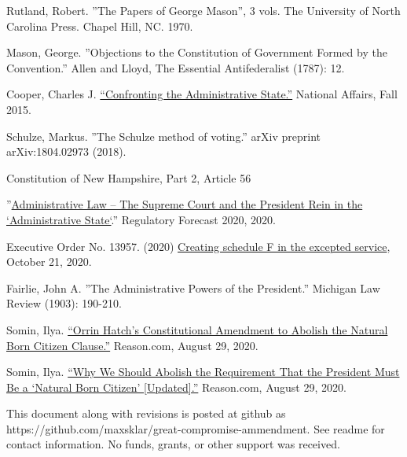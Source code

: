 \documentclass{article}
\begin{document}
\begin{thebibliography}{20}
Rutland, Robert. ”The Papers of George Mason”, 3 vols. The University of North Carolina Press. Chapel Hill, NC. 1970.

Mason, George. ”Objections to the Constitution of Government Formed by the Convention.” Allen and Lloyd, The Essential Antifederalist (1787): 12.

Cooper, Charles J. \href{https://www.nationalaffairs.com/publications/detail/confronting-the-administrative-state}{“Confronting the Administrative State.”} National Affairs, Fall 2015.

Schulze, Markus. ”The Schulze method of voting.” arXiv preprint arXiv:1804.02973 (2018).

Constitution of New Hampshire, Part 2, Article 56

”\href{https://www.crowell.com/a/web/bomv5ATK9LZPNrBA51skWq/4TtiyY/Regulatory-Forecast-2020-Administrative-Law-Crowell-Moring.pdf }{Administrative Law – The Supreme Court and the President Rein in the `Administrative State`}.” Regulatory Forecast 2020, 2020. 

Executive Order No. 13957. (2020) \href{https://www.
federalregister.gov/documents/2020/10/26/2020-23780/creating-schedule-f-in-the-excepted-service}{Creating schedule F in the excepted service}, October 21, 2020.

Fairlie, John A. ”The Administrative Powers of the President.” Michigan Law Review (1903): 190-210.

Somin, Ilya. \href{https://reason.com/volokh/2020/08/16/orrin-hatchs-constitutional-amendment-to-abolish-the-natural-born-citizen-clause/}{“Orrin Hatch’s Constitutional Amendment to Abolish the Natural Born Citizen Clause.”} Reason.com, August 29, 2020.

Somin, Ilya. \href{https://reason.com/volokh/2020/08/14/why-we-should-abolish-the-requirement-that-the-president-must-be-a-natural-born-citizen/}{“Why We Should Abolish the Requirement That the President Must Be a ‘Natural Born Citizen’ [Updated].”} Reason.com, August 29, 2020. 

\end{thebibliography}

This document along with revisions is posted at github as https://github.com/maxsklar/great-compromise-ammendment. See readme for contact information. No funds, grants, or other support was received.
\end{document}
